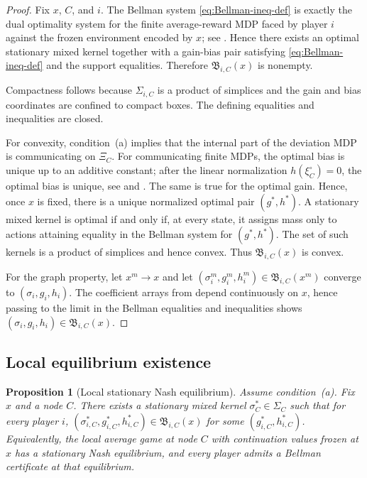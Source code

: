 \documentclass[12pt]{article}
\newtheorem{proposition}[theorem]{Proposition}
\theoremstyle{definition}
\newcommand{\1}{\mathbf{1}}
\begin{document}
\begin{proof}
Fix $x$, $C$, and $i$. The Bellman system
\eqref{eq:Bellman-ineq-def} is exactly the dual optimality system for the finite
average-reward MDP faced by player $i$ against the frozen environment encoded by
$x$; see . Hence there exists an optimal stationary mixed
kernel together with a gain-bias pair satisfying
\eqref{eq:Bellman-ineq-def} and the support equalities. Therefore
$\mathfrak B_{i,C}(x)$ is nonempty.

Compactness follows because $\Sigma_{i,C}$ is a product of simplices and the gain
and bias coordinates are confined to compact boxes. The defining equalities and
inequalities are closed.

For convexity, condition~\textnormal{(a)} implies that the internal part of the
deviation MDP is communicating on $\Xi_C$. For communicating finite MDPs, the
optimal bias is unique up to an additive constant; after the linear normalization
$h(\xi_C^\circ)=0$, the optimal bias is unique, see
 and \cite[Chapter~8]{Puterman1994}. The same is true for
the optimal gain. Hence, once $x$ is fixed, there is a unique normalized optimal
pair $(g^*,h^*)$. A stationary mixed kernel is optimal if and only if, at every
state, it assigns mass only to actions attaining equality in the Bellman system
for $(g^*,h^*)$. The set of such kernels is a product of simplices and hence
convex. Thus $\mathfrak B_{i,C}(x)$ is convex.

For the graph property, let $x^m\to x$ and let
$(\sigma_i^m,g_i^m,h_i^m)\in \mathfrak B_{i,C}(x^m)$ converge to
$(\sigma_i,g_i,h_i)$. The coefficient arrays from  depend
continuously on $x$, hence passing to the limit in the Bellman equalities and
inequalities shows $(\sigma_i,g_i,h_i)\in\mathfrak B_{i,C}(x)$.
\end{proof}

\subsection{Local equilibrium existence}

\begin{proposition}[Local stationary Nash equilibrium]
\label{prop:local-equilibrium}
Assume condition~\textnormal{(a)}. Fix $x$ and a node $C$. There exists a
stationary mixed kernel $\sigma_C^*\in\Sigma_C$ such that for every player $i$,
$(\sigma_{i,C}^*,g_{i,C}^*,h_{i,C}^*)\in \mathfrak B_{i,C}(x)$ for some
$(g_{i,C}^*,h_{i,C}^*)$. Equivalently, the local average game at node $C$ with
continuation values frozen at $x$ has a stationary Nash equilibrium, and every
player admits a Bellman certificate at that equilibrium.
\end{proposition}
\end{document}
